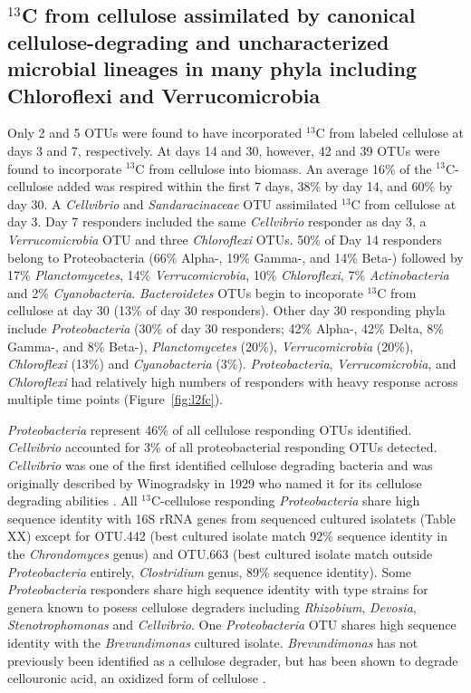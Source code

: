 \subsection{$^{13}$C from cellulose assimilated by canonical
cellulose-degrading and uncharacterized microbial lineages in many phyla
including Chloroflexi and Verrucomicrobia} Only 2 and 5 OTUs were found to have
incorporated $^{13}$C from labeled cellulose at days 3 and 7, respectively. At
days 14 and 30, however, 42 and 39 OTUs were found to incorporate $^{13}$C from
cellulose into biomass. An average 16\% of the $^{13}$C-cellulose added was
respired within the first 7 days, 38\% by day 14, and 60\% by day 30. A
\textit{Cellvibrio} and \textit{Sandaracinaceae} OTU assimilated $^{13}$C from
cellulose at day 3. Day 7 responders included the same \textit{Cellvibrio}
responder as day 3, a \textit{Verrucomicrobia} OTU and three
\textit{Chloroflexi} OTUs. 50\% of Day 14 responders belong to Proteobacteria
(66\% Alpha-, 19\% Gamma-, and 14\% Beta-) followed by 17\%
\textit{Planctomycetes}, 14\% \textit{Verrucomicrobia}, 10\%
\textit{Chloroflexi}, 7\% \textit{Actinobacteria} and 2\%
\textit{Cyanobacteria}. \textit{Bacteroidetes} OTUs begin to incoporate
$^{13}$C from cellulose at day 30 (13\% of day 30 responders). Other day 30
responding phyla include \textit{Proteobacteria} (30\% of day 30 responders;
42\% Alpha-, 42\% Delta, 8\% Gamma-, and 8\% Beta-), \textit{Planctomycetes}
(20\%), \textit{Verrucomicrobia} (20\%), \textit{Chloroflexi} (13\%) and
\textit{Cyanobacteria} (3\%). \textit{Proteobacteria},
\textit{Verrucomicrobia}, and \textit{Chloroflexi} had relatively high numbers
of responders with heavy response across multiple time points
(Figure~\ref{fig:l2fc}).

\textit{Proteobacteria} represent 46\% of all cellulose responding OTUs
identified. \textit{Cellvibrio} accounted for 3\% of all proteobacterial
responding OTUs detected. \textit{Cellvibrio} was one of the first identified
cellulose degrading bacteria and was originally described by Winogradsky in
1929 who named it for its cellulose degrading abilities
\citep{boone2001bergeys}. All $^{13}$C-cellulose responding
\textit{Proteobacteria} share high sequence identity with 16S rRNA genes from
sequenced cultured isolatets (Table XX) except for OTU.442 (best cultured
isolate match 92\% sequence identity in the \textit{Chrondomyces} genus) and
OTU.663 (best cultured isolate match outside \textit{Proteobacteria} entirely,
\textit{Clostridium} genus, 89\% sequence identity). Some
\textit{Proteobacteria} responders share high sequence identity with type
strains for genera known to posess cellulose degraders including
\textit{Rhizobium}, \textit{Devosia}, \textit{Stenotrophomonas} and
\textit{Cellvibrio}. One \textit{Proteobacteria} OTU shares high sequence
identity with the \textit{Brevundimonas} cultured isolate.
\textit{Brevundimonas} has not previously been identified as a cellulose
degrader, but has been shown to degrade cellouronic acid, an oxidized form of
cellulose \citep{Tavernier_2008}.

